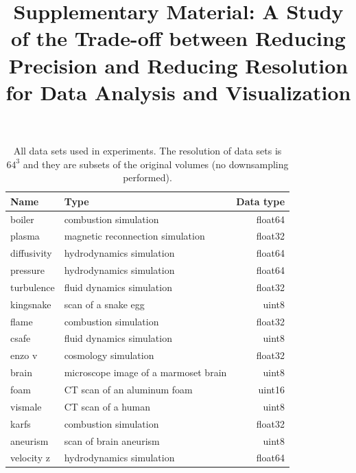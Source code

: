 \documentclass{article}
\title{Supplementary Material: A Study of the Trade-off between Reducing Precision and Reducing Resolution for Data Analysis and Visualization}
\date{}
\begin{document}
\maketitle


\begin{table}[ht]
        \caption{All data sets used in experiments. The resolution of data sets is $64^3$ and
        they are subsets of the original volumes (no downsampling performed).}
  \centering
  \begin{tabular}{llr}
  \toprule
  Name & Type & Data type \\
  \midrule
  boiler & combustion simulation& float64\\
  plasma & magnetic reconnection simulation& float32\\
  diffusivity & hydrodynamics simulation& float64\\
  pressure & hydrodynamics simulation& float64\\
  turbulence & fluid dynamics simulation& float32\\
  kingsnake & scan of a snake egg & uint8\\
  flame & combustion simulation& float32\\
  csafe & fluid dynamics simulation& uint8\\
  enzo v & cosmology simulation& float32\\
  brain & microscope image of a marmoset brain & uint8\\
  foam & CT scan of an aluminum foam & uint16\\
  vismale & CT scan of a human & uint8 \\
  karfs & combustion simulation& float32\\
  aneurism      & scan of brain aneurism & uint8 \\
  velocity z & hydrodynamics simulation& float64 \\
  \bottomrule
  \end{tabular}\label{tbl:data-sets}
\end{table}
\end{document}

